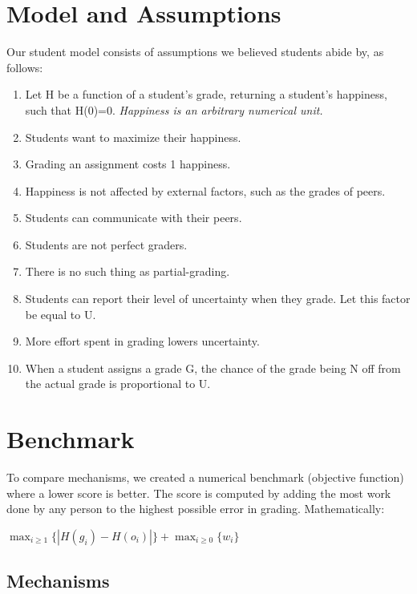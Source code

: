 \documentclass{sigchi}
\begin{document}
\section{Model and Assumptions}
Our student model consists of assumptions we believed students abide by, as follows:
\begin{enumerate}
  \item Let H be a function of a student's grade, returning a student's happiness, such that H(0)=0. \newline \textit{Happiness is an arbitrary numerical unit.}
  \item Students want to maximize their happiness.
  \item Grading an assignment costs 1 happiness.
  \item Happiness is not affected by external factors, such as the grades of peers.
  \item Students can communicate with their peers.
  \item Students are not perfect graders.
  \item There is no such thing as partial-grading.
  \item Students can report their level of uncertainty when they grade. Let this factor be equal to U.
  \item More effort spent in grading lowers uncertainty.
  \item When a student assigns a grade G, the chance of the grade being N off from the actual grade is proportional to U.
\end{enumerate}

\section{Benchmark}

To compare mechanisms, we created a numerical benchmark (objective function) where a lower score is better. The score is computed by adding the most work done by any person to the highest possible error in grading. Mathematically:

$\max_{i \ge 1} \{|H(g_i)-H(o_i)|\} + \max_{i \ge 0} \{w_i\}$

\subsection{Mechanisms}
\end{document}
